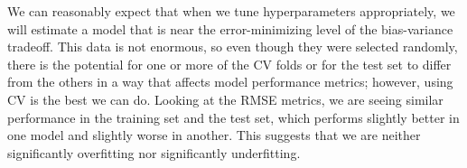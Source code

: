 \documentclass{article}
\begin{document}
We can reasonably expect that when we tune hyperparameters appropriately, we will estimate a model that is near the error-minimizing level of the bias-variance tradeoff. This data is not enormous, so even though they were selected randomly, there is the potential for one or more of the CV folds or for the test set to differ from the others in a way that affects model performance metrics; however, using CV is the best we can do. Looking at the RMSE metrics, we are seeing similar performance in the training set and the test set, which performs slightly better in one model and slightly worse in another. This suggests that we are neither significantly overfitting nor significantly underfitting.
\end{document}
